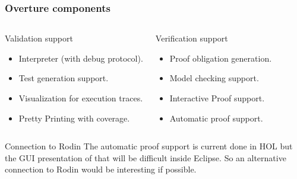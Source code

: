 \begin{frame}
	\frametitle{Overture components}
	\begin{columns}
			\begin{block}{Validation support}
				{\scriptsize\begin{itemize}
				  \item Interpreter (with debug protocol).
				  \item Test generation support.
				  \item Visualization for execution traces.      
				  \item Pretty Printing with coverage.
				\end{itemize}}
			\end{block}
			\begin{block}{Verification support}
				{\scriptsize\begin{itemize}
					\item Proof obligation generation.
					\item Model checking support.
					\item Interactive Proof support.
					\item Automatic proof support.      
				\end{itemize}}
			\end{block}
		\end{columns}

%
%
%
%

\begin{beamerboxesrounded}[upper=uppercol,lower=lowercol,shadow=true]{Connection to Rodin}
The automatic proof support is current done in HOL but the GUI presentation of that will be difficult inside Eclipse. So an alternative connection to Rodin would be interesting if possible.
\end{beamerboxesrounded}

\end{frame}

